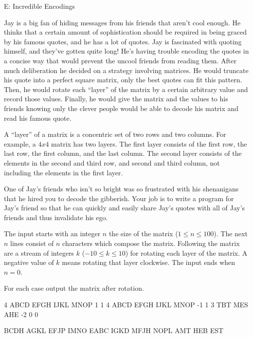 \begin{problem}{E: Incredible Encodings}

Jay is a big fan of hiding messages from his friends that aren't cool enough.
He thinks that a certain amount of sophistication should be required in being graced by his famous quotes, and he has a lot of quotes.
Jay is fascinated with quoting himself, and they've gotten quite long!
He's having trouble encoding the quotes in a concise way that would prevent the uncool friends from reading them.
After much deliberation he decided on a strategy involving matrices.
He would truncate his quote into a perfect square matrix, only the best quotes can fit this pattern.
Then, he would rotate each ``layer'' of the matrix by a certain arbitrary value and record those values.
Finally, he would give the matrix and the values to his friends knowing only the clever people would be able to decode his matrix and read his famous quote.

A ``layer'' of a matrix is a concentric set of two rows and two columns. For example, a $4x4$ matrix has two layers. The first layer consists of the first row, the last row, the first column, and the last column. The second layer consists of the elements in the second and third row, and second and third column, not including the elements in the first layer.

One of Jay's friends who isn't so bright was so frustrated with his shenanigans that he hired you to decode the gibberish.
Your job is to write a program for Jay's friend so that he can quickly and easily share Jay's quotes with all of Jay's friends and thus invalidate his ego.

\end{problem}

\begin{formalin}
The input starts with an integer $n$ the size of the matrix ($1 \leq n \leq 100$).
The next $n$ lines consist of $n$ characters which compose the matrix.
Following the matrix are a stream of integers $k$ ($-10 \leq k \leq 10$) for rotating each layer of the matrix.
A negative value of $k$ means rotating that layer clockwise.
The input ends when $n = 0$.
\end{formalin}

\begin{formalout}
For each case output the matrix after rotation.
\end{formalout}

\begin{datain}
4
ABCD
EFGH
IJKL
MNOP
1
1
4
ABCD
EFGH
IJKL
MNOP
-1
1
3
TBT
MES
AHE
-2
0
0
\end{datain}

\begin{dataout}
BCDH
AGKL
EFJP
IMNO
EABC
IGKD
MFJH
NOPL
AMT
HEB
EST
\end{dataout}

